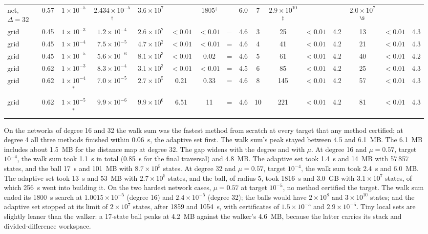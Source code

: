 \documentclass[aps,pra,superscriptaddress,floatfix,longbibliography,twocolumn]{revtex4-2}
\begin{document}
\begin{table}[t]
\begin{ruledtabular}
\begin{tabular}{lcc|cccccc|cccc|ccc}
net, $\Delta=32$ & 0.57 & $1\times10^{-5}$ & $2.434\times10^{-5}$$^{\dagger}$ & $3.6\times10^{7}$ & -- & 1805$^{\dagger}$ & -- & 6.0 & 7 & $2.9\times10^{10}$$^{\ddagger}$ & -- & -- & $2.0\times10^{7}$$^{\S}$ & -- & -- \\
grid & 0.45 & $1\times10^{-3}$ & $1.2\times10^{-4}$ & $2.6\times10^{2}$ & $<0.01$ & $<0.01$ & = & 4.6 & 3 & 25 & $<0.01$ & 4.2 & 13 & $<0.01$ & 4.3 \\
grid & 0.45 & $1\times10^{-4}$ & $7.5\times10^{-5}$ & $4.7\times10^{2}$ & $<0.01$ & $<0.01$ & = & 4.6 & 4 & 41 & $<0.01$ & 4.2 & 21 & $<0.01$ & 4.3 \\
grid & 0.45 & $1\times10^{-5}$ & $5.6\times10^{-6}$ & $8.1\times10^{3}$ & $<0.01$ & 0.02 & = & 4.6 & 5 & 61 & $<0.01$ & 4.2 & 40 & $<0.01$ & 4.2 \\
grid & 0.62 & $1\times10^{-3}$ & $8.3\times10^{-4}$ & $3.1\times10^{3}$ & $<0.01$ & $<0.01$ & = & 4.5 & 6 & 85 & $<0.01$ & 4.2 & 25 & $<0.01$ & 4.3 \\
grid & 0.62 & $1\times10^{-4}$$^*$ & $7.0\times10^{-5}$ & $2.7\times10^{5}$ & 0.21 & 0.33 & = & 4.6 & 8 & 145 & $<0.01$ & 4.2 & 57 & $<0.01$ & 4.3 \\
grid & 0.62 & $1\times10^{-5}$$^*$ & $9.9\times10^{-6}$ & $9.9\times10^{6}$ & 6.51 & 11 & = & 4.6 & 10 & 221 & $<0.01$ & 4.2 & 81 & $<0.01$ & 4.3 \\
\end{tabular}
\end{ruledtabular}
\end{table}

On the networks of degree 16 and 32 the walk sum was the fastest method from scratch at every target that any method certified; at degree 4 all three methods finished within 0.06~s, the adaptive set first. The walk sum's peak stayed between 4.5 and 6.1~MB. The 6.1~MB includes about 1.5~MB for the distance map at degree 32. The gap widens with the degree and with $\mu$. At degree 16 and $\mu=0.57$, target $10^{-4}$, the walk sum took 1.1~s in total (0.85~s for the final traversal) and 4.8~MB. The adaptive set took 1.4~s and 14~MB with 57\,857 states, and the ball 17~s and 101~MB with $8.7\times10^5$ states. At degree 32 and $\mu=0.57$, target $10^{-4}$, the walk sum took 2.4~s and 6.0~MB. The adaptive set took 13~s and 53~MB with $2.7\times10^5$ states, and the ball, of radius 5, took 1816~s and 3.0~GB with $3.1\times10^7$ states, of which 256~s went into building it. On the two hardest network cases, $\mu=0.57$ at target $10^{-5}$, no method certified the target. The walk sum ended its 1800~s search at $1.0015\times10^{-5}$ (degree 16) and $2.4\times10^{-5}$ (degree 32); the balls would have $2\times10^8$ and $3\times10^{10}$ states; and the adaptive set stopped at its limit of $2\times10^7$ states, after 1859 and 1054~s, with certificates of $1.5\times10^{-5}$ and $2.9\times10^{-5}$. Tiny local sets are slightly leaner than the walker: a 17-state ball peaks at 4.2~MB against the walker's 4.6~MB, because the latter carries its stack and divided-difference workspace.
\end{document}
